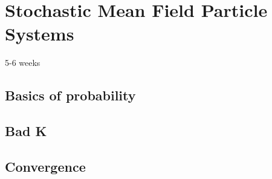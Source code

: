 \chapter{Stochastic Mean Field Particle Systems}
5-6 weeks
\section{Basics of probability}
\section{Bad K}
\section{Convergence}
